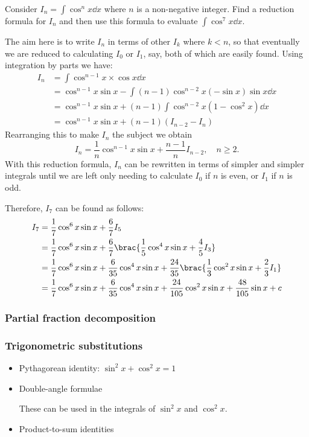 \begin{exercise}
Consider $I_n=\int\cos^nx\dd{x}$ where $n$ is a non-negative integer. Find a reduction formula for $I_n$ and then use this formula to evaluate $\int\cos^7x\dd{x}$.
\end{exercise}
\begin{solution}
The aim here is to write $I_n$ in terms of other $I_k$ where $k<n$, so that eventually we are reduced to calculating $I_0$ or $I_1$, say, both of which are easily found. Using integration by parts we have:
\begin{align*}
I_n &= \int\cos^{n-1}x \times \cos x\dd{x} \\
&= \cos^{n-1}x\sin x-\int(n-1)\cos^{n-2}x(-\sin x)\sin x\dd{x} \\
&= \cos^{n-1}x\sin x+(n-1)\int\cos^{n-2}x(1-\cos^2x)\dd{x} \\
&= \cos^{n-1}x\sin x+(n-1)(I_{n-2}-I_n)
\end{align*}
Rearranging this to make $I_n$ the subject we obtain
\[ I_n=\frac{1}{n}\cos^{n-1}x\sin x+\frac{n-1}{n}I_{n-2}, \quad n\ge2. \]
With this reduction formula, $I_n$ can be rewritten in terms of simpler and simpler integrals until we are left only needing to calculate $I_0$ if $n$ is even, or $I_1$ if $n$ is odd.

Therefore, $I_7$ can be found as follows:
\begin{align*}
I_7 &= \frac{1}{7}\cos^6x\sin x+\frac{6}{7}I_5 \\
&= \frac{1}{7}\cos^6x\sin x+\frac{6}{7}\brac{\frac{1}{5}\cos^4x\sin x+\frac{4}{5}I_3} \\
&= \frac{1}{7}\cos^6x\sin x+\frac{6}{35}\cos^4x\sin x+\frac{24}{35}\brac{\frac{1}{3}\cos^2x\sin x+\frac{2}{3}I_1} \\
&= \frac{1}{7}\cos^6x\sin x+\frac{6}{35}\cos^4x\sin x+\frac{24}{105}\cos^2x\sin x+\frac{48}{105}\sin x+c
\end{align*}
\end{solution}

\subsubsection{Partial fraction decomposition}

\subsubsection{Trigonometric substitutions}
\begin{itemize}
\item Pythagorean identity: $\sin^2x + \cos^2x = 1$

\item Double-angle formulae

These can be used in the integrals of $\sin^2x$ and $\cos^2x$.

\item Product-to-sum identities
\end{itemize}


